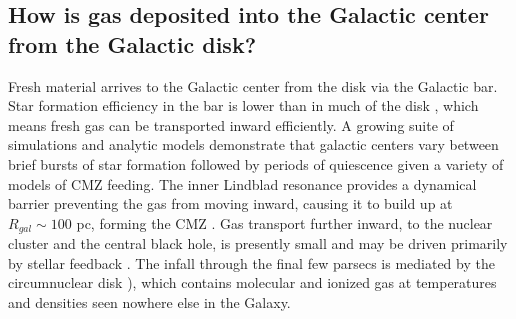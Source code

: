 \documentclass[modern]{aastex62}
\begin{document}
\subsection{How is gas deposited into the Galactic center from the Galactic disk?}
Fresh material arrives to the Galactic center from the disk via the Galactic bar.
Star formation efficiency in the bar is lower than in much of the disk
\citep[e.g.,][]{Muraoka2019a,Seo2019a}, which means fresh gas can be
transported inward efficiently.
A growing suite of simulations and analytic models
\citep{Krumholz2015b,Sormani2015a,Torrey2017c,Ridley2017a,Krumholz2017a,Sormani2018a,Jeffreson2018b}
demonstrate that galactic centers vary between brief bursts of star formation 
followed by periods of quiescence given a variety of models of CMZ feeding.  The inner Lindblad resonance provides
a dynamical barrier preventing the gas from moving inward, causing it to build
up at $R_{gal}\sim100$ pc, forming the CMZ \citep{Krumholz2015b}.  Gas transport further
inward, to the nuclear cluster and the central black hole, is presently small
and may be driven primarily by stellar feedback
\citep[e.g.,][]{Davies2007a,Kruijssen2017a,Sormani2018b}. The infall through
the final few parsecs is mediated by the circumnuclear disk \citep[CND;
e.g.,][]{Takekawa2017a,Hsieh2017a}), which contains molecular and ionized gas
at temperatures and densities seen nowhere else in the Galaxy.
\end{document}
